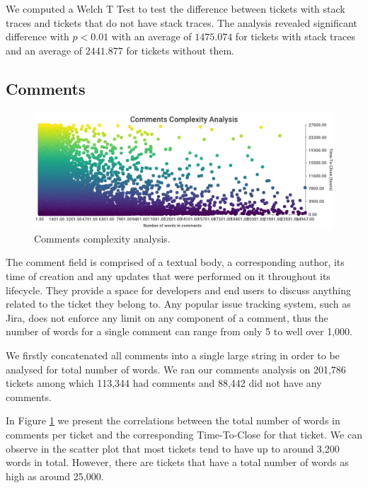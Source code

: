 \documentclass{mpaper}
\begin{document}
We computed a Welch T Test to test the difference between tickets with stack traces and tickets that 
do not have stack traces. The analysis revealed significant difference with $p < 0.01$ with an
average of $1475.074$ for tickets with stack traces and an average of $2441.877$
for tickets without them.

\subsection{Comments}

\begin{figure}[ht]
  \begin{center}
    \includegraphics[scale=0.23]{images/comment_complexity.png}
  \end{center}
  \caption{\label{comments}Comments complexity analysis.}
\end{figure}

The comment field is comprised of a textual body, a corresponding author, its time of creation and any updates 
that were performed on it throughout its lifecycle. They provide a space for developers and end users to discuss 
anything related to the ticket they belong to. Any popular issue tracking system, such as Jira, does not enforce 
any limit on any component of a comment, thus the number of words for a single comment can range from only 5 
to well over 1,000. 

We firstly concatenated all comments into a single large string in order to be analysed for total number of words.
We ran our comments analysis on 201,786 tickets among which 113,344 had comments and 88,442 did not have any comments. 

In Figure \ref{comments} we present the correlations between the total number of words in comments per ticket and 
the corresponding Time-To-Close for that ticket. We can observe in the scatter plot that most tickets tend to 
have up to around 3,200 words in total. However, there are tickets that have a total number of words as high as 
around 25,000. 
\end{document}
